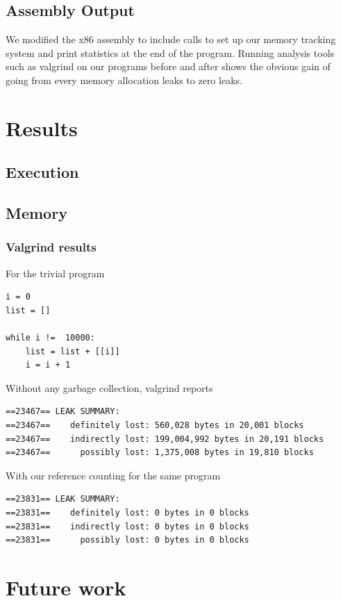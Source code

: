 \documentclass{sigplanconf}
\begin{document}
\subsection{Assembly Output}
We modified the x86 assembly to include calls to set up our memory tracking system and print statistics at the end of the program.  Running analysis tools such as valgrind on our programs before and after shows the obvious gain of going from every memory allocation leaks to zero leaks.

\section{Results}
\label{sec:results}

\subsection{Execution}

\subsection{Memory}

\subsubsection{Valgrind results}
For the trivial program
\begin{verbatim}
i = 0
list = []

while i !=  10000:
    list = list + [[i]]
    i = i + 1

\end{verbatim}
Without any garbage collection, valgrind reports 
\begin{verbatim}
==23467== LEAK SUMMARY:
==23467==    definitely lost: 560,028 bytes in 20,001 blocks
==23467==    indirectly lost: 199,004,992 bytes in 20,191 blocks
==23467==      possibly lost: 1,375,008 bytes in 19,810 blocks
\end{verbatim}
With our reference counting for the same program
\begin{verbatim}
==23831== LEAK SUMMARY:
==23831==    definitely lost: 0 bytes in 0 blocks
==23831==    indirectly lost: 0 bytes in 0 blocks
==23831==      possibly lost: 0 bytes in 0 blocks
\end{verbatim}

\section{Future work}
\label{sec:future}
\end{document}

